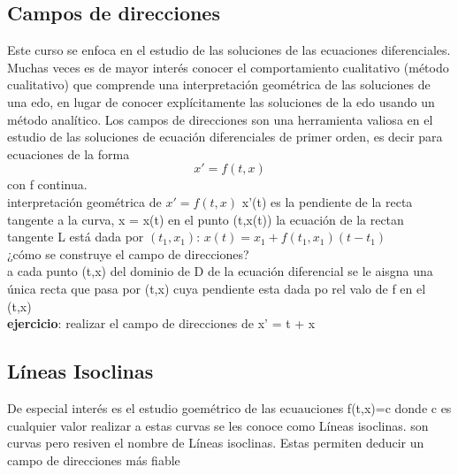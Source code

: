 \documentclass{book}
\begin{document}
    \subsection{Campos de direcciones}
    Este curso se enfoca en el estudio de las soluciones de las ecuaciones
    diferenciales.
    Muchas veces es de mayor interés conocer el comportamiento cualitativo
    (método cualitativo) que comprende una interpretación geométrica de las
    soluciones de una edo, en lugar de conocer explícitamente las soluciones
    de la edo usando un método analítico.
    Los campos de direcciones son una herramienta valiosa en el estudio de
    las soluciones de ecuación diferenciales de primer orden, es decir para
    ecuaciones de la forma
    \begin{equation*}
        x'=f(t,x)
    \end{equation*}
    con f continua.\\ 
    interpretación geométrica de $x'=f(t,x)$
    x'(t) es la pendiente de la recta tangente a la curva, x = x(t) en el punto (t,x(t))
    la ecuación de la rectan tangente L está dada por $(t_{1},x_{1})$: $x(t)=x_{1}+f(t_{1},x_{1})(t-t_{1})$\\ 
    ¿cómo se construye el campo de direcciones? 
    \\ a cada punto (t,x) del dominio de D de la ecuación diferencial se le aisgna una única recta que pasa por 
    (t,x) cuya pendiente esta dada po rel valo de f en el (t,x)
    \\ 
    \textbf{ejercicio}: realizar el campo de direcciones de x' = t + x\\ 
    \subsection{Líneas Isoclinas}
    De especial interés es el estudio goemétrico de las ecuauciones f(t,x)=c donde c es cualquier valor realizar
    a estas curvas se les conoce como Líneas isoclinas. son curvas pero resiven el nombre de Líneas isoclinas.
    Estas permiten deducir un campo de direcciones más fiable
    
\end{document}
